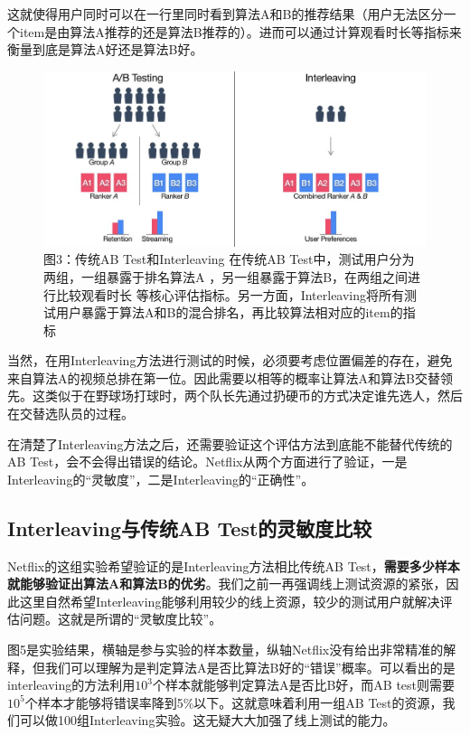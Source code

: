 \documentclass[12pt]{article}
\begin{document}
这就使得用户同时可以在一行里同时看到算法A和B的推荐结果（用户无法区分一个item是由算法A推荐的还是算法B推荐的）。进而可以通过计算观看时长等指标来衡量到底是算法A好还是算法B好。
\begin{figure}[H]
    \centering
    \includegraphics[width=1\textwidth]{fig/Netflix_Interleaving_Vs_AB_Test.jpg}
    \caption*{图3：传统AB Test和Interleaving 在传统AB Test中，测试用户分为两组，一组暴露于排名算法A ，另一组暴露于算法B，在两组之间进行比较观看时长	等核心评估指标。另一方面，Interleaving将所有测试用户暴露于算法A和B的混合排名，再比较算法相对应的item的指标}
\end{figure}

当然，在用Interleaving方法进行测试的时候，必须要考虑位置偏差的存在，避免来自算法A的视频总排在第一位。因此需要以相等的概率让算法A和算法B交替领先。这类似于在野球场打球时，两个队长先通过扔硬币的方式决定谁先选人，然后在交替选队员的过程。

在清楚了Interleaving方法之后，还需要验证这个评估方法到底能不能替代传统的AB Test，会不会得出错误的结论。Netflix从两个方面进行了验证，一是Interleaving的“灵敏度”，二是Interleaving的“正确性”。

\subsection{Interleaving与传统AB Test的灵敏度比较}
Netflix的这组实验希望验证的是Interleaving方法相比传统AB Test，\textbf{需要多少样本就能够验证出算法A和算法B的优劣}。我们之前一再强调线上测试资源的紧张，因此这里自然希望Interleaving能够利用较少的线上资源，较少的测试用户就解决评估问题。这就是所谓的“灵敏度比较”。

图5是实验结果，横轴是参与实验的样本数量，纵轴Netflix没有给出非常精准的解释，但我们可以理解为是判定算法A是否比算法B好的“错误”概率。可以看出的是interleaving的方法利用$10^3$个样本就能够判定算法A是否比B好，而AB test则需要$10^5$个样本才能够将错误率降到5\%以下。这就意味着利用一组AB Test的资源，我们可以做100组Interleaving实验。这无疑大大加强了线上测试的能力。
\end{document}
